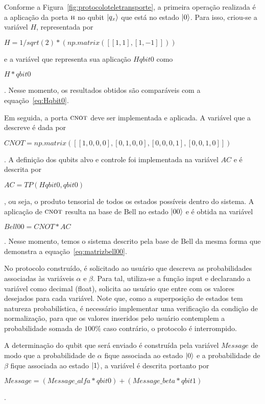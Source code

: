 Conforme a Figura~\ref{fig:protocoloteletransporte}, a primeira operação realizada é a aplicação da porta \(\operatorname{\textsc{h}}\) no qubit $\ket{q_x}$ que está no estado $\ket{0}$. Para isso, criou-se a variável \textit{$H$}, representada por \begin{tiny}\textbf{$H = 1/sqrt(2)*(np.matrix([[1,1], [1,-1]]))$}\end{tiny} e a variável que representa sua aplicação \textit{$Hqbit0$} como \begin{tiny}\textbf{$H*qbit0$}\end{tiny}. Nesse momento, os resultados obtidos são comparáveis com a equação~\eqref{eq:Hqbit0}. 

Em seguida, a porta \(\operatorname{\textsc{cnot}}\) deve ser implementada e aplicada. A variável que a descreve é dada por \begin{tiny}\textbf{$CNOT = np.matrix([[1,0,0,0],[0,1,0,0],[0,0,0,1],[0,0,1,0]])$}\end{tiny}. A definição dos qubits alvo e controle foi implementada na variável \textit{$AC$} e é descrita por \begin{tiny}\textbf{$AC= TP(Hqbit0,qbit0)$}\end{tiny}, ou seja, o produto tensorial de todos os estados possíveis dentro do sistema. A aplicação de \(\operatorname{\textsc{cnot}}\) resulta na base de Bell no estado $\ket{00}$ e é obtida na variável \begin{tiny}\textbf{$Bell00 = CNOT * AC$}\end{tiny}. Nesse momento, temos o sistema descrito pela base de Bell da mesma forma que demonstra a equação~\eqref{eq:matrizbell00}. 

No protocolo construído, é solicitado ao usuário que descreva as probabilidades associadas às variáveis $\alpha$ e $\beta$. Para tal, utiliza-se a função input e declarando a variável como decimal (float), solicita ao usuário que entre com os valores desejados para cada variável. Note que, como a superposição de estados tem natureza probabilística, é necessário implementar uma verificação da condição de normalização, para que os valores inseridos pelo usuário contemplem a probabilidade somada de $100\%$ caso contrário, o protocolo é interrompido.

A determinação do qubit que será enviado é construída pela variável \textit{$Message$} de modo que a probabilidade de $\alpha$ fique associada ao estado $\ket{0}$ e a probabilidade de $\beta$ fique associada ao estado $\ket{1}$, a variável é descrita portanto por \begin{tiny}\textbf{$Message = (Message\_alfa * qbit0) + (Message\_beta * qbit1)$}\end{tiny}.

